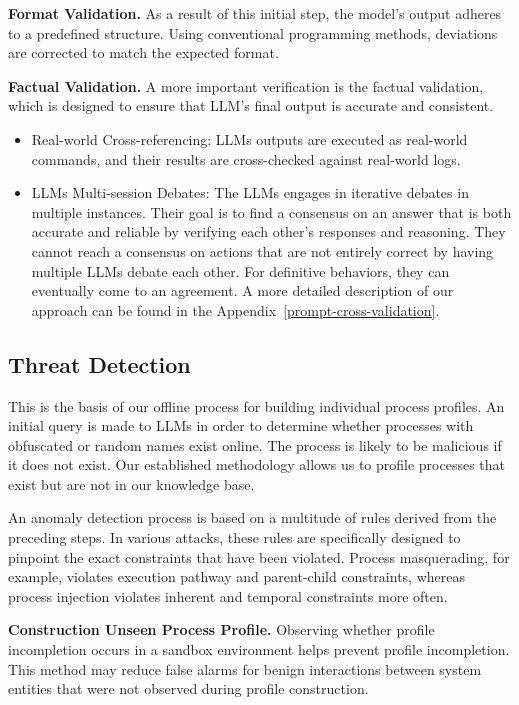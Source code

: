 \textbf{Format Validation.}
As a result of this initial step, the model's output adheres to a predefined structure. Using conventional programming methods, deviations are corrected to match the expected format.

\textbf{Factual Validation.}
A more important verification is the factual validation, which is designed to ensure that LLM's final output is accurate and consistent.

\begin{itemize}
    \item Real-world Cross-referencing: LLMs outputs are executed as real-world commands, and their results are cross-checked against real-world logs.
    \item LLMs Multi-session Debates: The LLMs engages in iterative debates in multiple instances. Their goal is to find a consensus on an answer that is both accurate and reliable by verifying each other's responses and reasoning. They cannot reach a consensus on actions that are not entirely correct by having multiple LLMs debate each other. For definitive behaviors, they can eventually come to an agreement. A more detailed description of our approach can be found in the Appendix~\ref{prompt-cross-validation}.
\end{itemize}



\subsection{Threat Detection}
\label{sec:Threat_detection}

This is the basis of our offline process for building individual process profiles. An initial query is made to LLMs in order to determine whether processes with obfuscated or random names exist online. The process is likely to be malicious if it does not exist. Our established methodology allows us to profile processes that exist but are not in our knowledge base.

An anomaly detection process is based on a multitude of rules derived from the preceding steps. In various attacks, these rules are specifically designed to pinpoint the exact constraints that have been violated. Process masquerading, for example, violates execution pathway and parent-child constraints, whereas process injection violates inherent and temporal constraints more often.

\textbf{Construction Unseen Process Profile.}
Observing whether profile incompletion occurs in a sandbox environment helps prevent profile incompletion. This method may reduce false alarms for benign interactions between system entities that were not observed during profile construction.